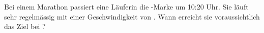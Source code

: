 Bei einem Marathon passiert eine Läuferin die \sMO-Marke um 10:20 Uhr. Sie läuft sehr regelmässig mit einer Geschwindigkeit von \vMO. Wann erreicht sie voraussichtlich das Ziel bei \sZO?
